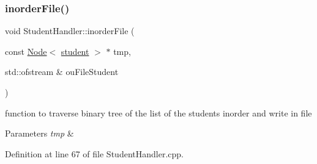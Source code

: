 \subsubsection{\texorpdfstring{inorder\+File()}{inorderFile()}}
{\footnotesize\ttfamily void Student\+Handler\+::inorder\+File (\begin{DoxyParamCaption}\item[{const \hyperlink{class_node}{Node}$<$ \hyperlink{classstudent}{student} $>$ $\ast$}]{tmp,  }\item[{std\+::ofstream \&}]{ou\+File\+Student }\end{DoxyParamCaption})\hspace{0.3cm}{\ttfamily [private]}}

function to traverse binary tree of the list of the students inorder and write in file 
\begin{DoxyParams}{Parameters}
{\em tmp} & \\
\hline
\end{DoxyParams}


Definition at line 67 of file Student\+Handler.\+cpp.


